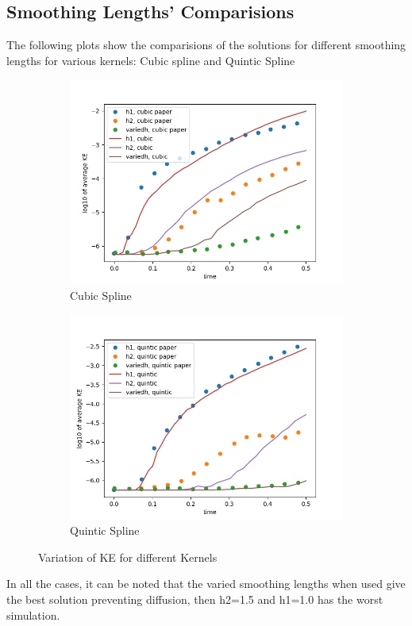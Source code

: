 \documentclass{beamer}
\begin{document}
\subsection{Smoothing Lengths' Comparisions}
\begin{frame}
The following plots show the comparisions of the solutions for different smoothing lengths for various kernels: Cubic spline and Quintic Spline

\begin{figure}[H]
\centering
\begin{subfigure}[b]{0.45\textwidth}
\includegraphics[width=\linewidth]{./case13.png}
\caption{Cubic Spline}
\end{subfigure}
\begin{subfigure}[b]{0.45\textwidth}
\includegraphics[width=\linewidth]{./case14.png}
\caption{Quintic Spline}
\end{subfigure}
\caption{Variation of KE for different Kernels}
\end{figure}

In all the cases, it can be noted that the varied smoothing lengths when used give the best solution preventing diffusion, then h2=1.5 and h1=1.0 has the worst simulation. 
\end{frame}
\end{document}
